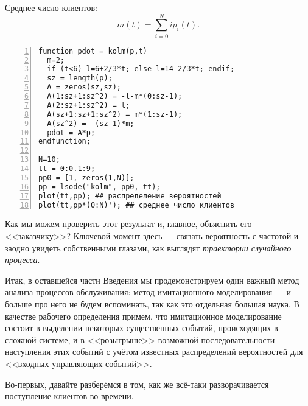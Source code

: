 \documentclass[10pt,oneside,final]{book}
\begin{document}
Среднее число клиентов:
\[
m(t)=\sum_{i=0}^N i p_i(t).
\]
\begin{Verbatim}[frame=single,xleftmargin=2em,numbers=left]
function pdot = kolm(p,t)
  m=2;
  if (t<6) l=6+2/3*t; else l=14-2/3*t; endif;
  sz = length(p);
  A = zeros(sz,sz);
  A(1:sz+1:sz^2) = -l-m*(0:sz-1);
  A(2:sz+1:sz^2) = l;
  A(sz+1:sz+1:sz^2) = m*(1:sz-1);
  A(sz^2) = -(sz-1)*m;
  pdot = A*p;
endfunction;

N=10;
tt = 0:0.1:9;
pp0 = [1, zeros(1,N)];
pp = lsode("kolm", pp0, tt);
plot(tt,pp); ## распределение вероятностей
plot(tt,pp*(0:N)'); ## среднее число клиентов
\end{Verbatim}


Как мы можем проверить этот результат и, главное, объяснить его <<заказчику>>? 
Ключевой момент здесь --- связать вероятность с частотой и заодно увидеть
собственными глазами, как выглядят \emph{траектории случайного процесса}.

Итак, в оставшейся части Введения мы продемонстрируем один важный метод анализа
процессов обслуживания: метод имитационного моделирования --- и больше про него
не будем вспоминать, так как это отдельная большая наука. В качестве рабочего
определения примем, что имитационное моделирование состоит в выделении некоторых
существенных событий, происходящих в сложной системе, и в <<розыгрыше>>
возможной последовательности наступления этих событий с учётом известных
распределений вероятностей для <<входных управляющих событий>>. 

Во-первых, давайте разберёмся в том, как же всё-таки разворачивается поступление
клиентов во времени.
\end{document}
